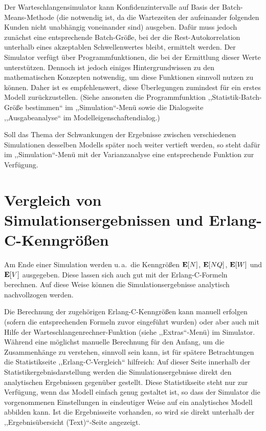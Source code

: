 \documentclass[deutsch]{svmono}
\begin{document}
Der Warteschlangensimulator kann Konfidenzintervalle auf Basis der Batch-Means-Methode (die notwendig ist, da die Wartezeiten der aufeinander folgenden Kunden nicht unabhängig voneinander sind) ausgeben. Dafür muss jedoch zunächst eine entsprechende Batch-Größe, bei der die Rest-Autokorrelation unterhalb eines akzeptablen Schwellenwertes bleibt, ermittelt werden. Der Simulator verfügt über Programmfunktionen, die bei der Ermittlung dieser Werte unterstützen. Dennoch ist jedoch einiges Hintergrundwissen zu den mathematischen Konzepten notwendig, um diese Funktionen sinnvoll nutzen zu können. Daher ist es empfehlenswert, diese Überlegungen zumindest für ein erstes Modell zurückzustellen. (Siehe ansonsten die Programmfunktion ,,Statistik-Batch-Größe bestimmen`` im ,,Simulation``-Menü sowie die Dialogseite ,,Ausgabeanalyse`` im Modelleigenschaftendialog.)

Soll das Thema der Schwankungen der Ergebnisse zwischen verschiedenen Simulationen desselben Modells später noch weiter vertieft werden, so steht dafür im ,,Simulation``-Menü mit der Varianzanalyse eine entsprechende Funktion zur Verfügung.



\section{Vergleich von Simulationsergebnissen und Erlang-C-Kenngrößen}

Am Ende einer Simulation werden u.\,a.\ die Kenngrößen ${\bf E}[N]$, ${\bf E}[NQ]$, ${\bf E}[W]$ und ${\bf E}[V]$ ausgegeben. Diese lassen sich auch gut mit der Erlang-C-Formeln berechnen. Auf diese Weise können die Simulationsergebnisse analytisch nachvollzogen werden.

Die Berechnung der zugehörigen Erlang-C-Kenngrößen kann manuell erfolgen (sofern die entsprechenden Formeln zuvor eingeführt wurden) oder aber auch mit Hilfe der Warteschlangenrechner-Funktion (siehe ,,Extras``-Menü) im Simulator. Während eine möglichst manuelle Berechnung für den Anfang, um die Zusammenhänge zu verstehen, sinnvoll sein kann, ist für spätere Betrachtungen die Statistikseite ,,Erlang-C-Vergleich`` hilfreich: Auf dieser Seite innerhalb der Statistikergebnisdarstellung werden die Simulationsergebnisse direkt den analytischen Ergebnissen gegenüber gestellt. Diese Statistikseite steht nur zur Verfügung, wenn das Modell einfach genug gestaltet ist, so dass der Simulator die vorgenommenen Einstellungen in eindeutiger Weise auf ein analytisches Modell abbilden kann. Ist die Ergebnisseite vorhanden, so wird sie direkt unterhalb der ,,Ergebnisübersicht (Text)``-Seite angezeigt.
\end{document}
